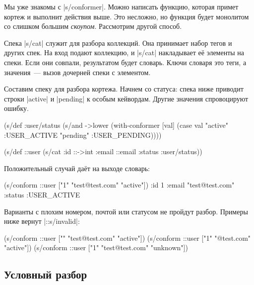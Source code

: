 Мы уже знакомы с \spverb|s/conformer|. Можно написать функцию, которая примет
кортеж и выполнит действия выше. Это несложно, но функция будет монолитом со
слишком большим \emph{скоупом}. Рассмотрим другой способ.


Спека \spverb|s/cat| служит для разбора коллекций. Она принимает набор тегов и
других спек. На вход подают коллекцию, и \spverb|s/cat| накладывает е\"{е}
элементы на спеки. Если они совпали, результатом будет словарь. Ключи словаря
это теги, а значения~--- вызов дочерней спеки с элементом.

Составим спеку для разбора кортежа. Начнем со статуса: спека ниже приводит
строки \spverb|active| и \spverb|pending| к особым кейвордам. Другие значения
спровоцируют ошибку.

\begin{english}
  \begin{clojure}
(s/def :user/status
  (s/and ->lower
         (with-conformer [val]
           (case val
             "active"  :USER_ACTIVE
             "pending" :USER_PENDING))))

(s/def ::user
  (s/cat :id ::->int
         :email ::email
         :status :user/status))
  \end{clojure}
\end{english}

\noindent
Положительный случай да\"{е}т на выходе словарь:

\begin{english}
  \begin{clojure}
(s/conform ::user ["1" "test@test.com" "active"])
{:id 1
 :email "test@test.com"
 :status :USER_ACTIVE}
  \end{clojure}
\end{english}

Варианты с плохим номером, почтой или статусом не пройдут разбор. Примеры ниже
вернут \spverb|::s/invalid|:

\begin{english}
  \begin{clojure}
(s/conform ::user ["" "test@test.com" "active"])
(s/conform ::user ["1" "@test.com" "active"])
(s/conform ::user ["1" "test@test.com" "unknown"])
  \end{clojure}
\end{english}

\subsection{Условный разбор}

